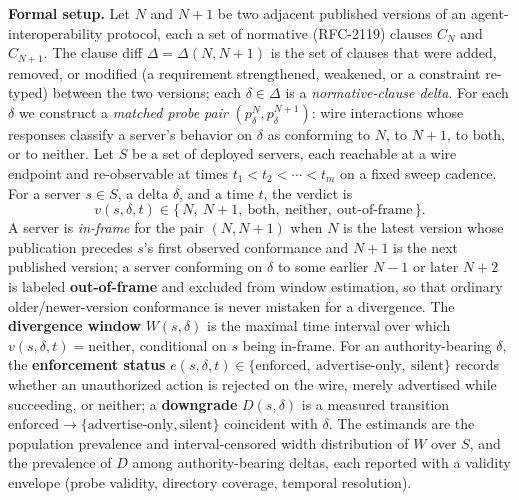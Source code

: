 \documentclass[11pt]{article}
\begin{document}
\textbf{Formal setup.} Let $N$ and $N{+}1$ be two adjacent published versions of an agent-interoperability protocol, each a set of normative (RFC-2119) clauses $C_N$ and $C_{N+1}$. The clause diff $\Delta = \Delta(N, N{+}1)$ is the set of clauses that were added, removed, or modified (a requirement strengthened, weakened, or a constraint re-typed) between the two versions; each $\delta \in \Delta$ is a \emph{normative-clause delta}. For each $\delta$ we construct a \emph{matched probe pair} $(p_\delta^N, p_\delta^{N+1})$: wire interactions whose responses classify a server's behavior on $\delta$ as conforming to $N$, to $N{+}1$, to both, or to neither. Let $S$ be a set of deployed servers, each reachable at a wire endpoint and re-observable at times $t_1 < t_2 < \cdots < t_m$ on a fixed sweep cadence. For a server $s \in S$, a delta $\delta$, and a time $t$, the verdict is
\[
  v(s, \delta, t) \in \{\, N,\ N{+}1,\ \text{both},\ \text{neither},\ \text{out-of-frame} \,\}.
\]
A server is \emph{in-frame} for the pair $(N, N{+}1)$ when $N$ is the latest version whose publication precedes $s$'s first observed conformance and $N{+}1$ is the next published version; a server conforming on $\delta$ to some earlier $N{-}1$ or later $N{+}2$ is labeled \textbf{out-of-frame} and excluded from window estimation, so that ordinary older/newer-version conformance is never mistaken for a divergence. The \textbf{divergence window} $W(s, \delta)$ is the maximal time interval over which $v(s, \delta, t) = \text{neither}$, conditional on $s$ being in-frame. For an authority-bearing $\delta$, the \textbf{enforcement status} $e(s, \delta, t) \in \{\text{enforced},\ \text{advertise-only},\ \text{silent}\}$ records whether an unauthorized action is rejected on the wire, merely advertised while succeeding, or neither; a \textbf{downgrade} $D(s, \delta)$ is a measured transition $\text{enforced} \to \{\text{advertise-only}, \text{silent}\}$ coincident with $\delta$. The estimands are the population prevalence and interval-censored width distribution of $W$ over $S$, and the prevalence of $D$ among authority-bearing deltas, each reported with a validity envelope (probe validity, directory coverage, temporal resolution).
\end{document}
